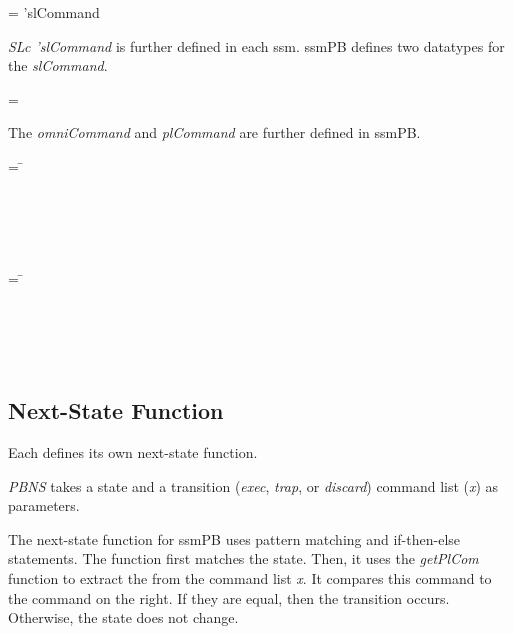 \documentclass[../../main/main.tex]{subfiles}
\begin{document}
 =   \HOLTokenBar{}  'slCommand

\textit{SLc 'slCommand} is further defined in each \gls{ssm}.  ssmPB defines two datatypes for the \textit{slCommand}.

 =   \HOLTokenBar{}  

The \textit{omniCommand} and \textit{plCommand} are further defined in ssmPB.

\begin{tabbing}
 = \= \\
						\>\HOLTokenBar{} \\
            					\>\HOLTokenBar{}  \\
						\>\HOLTokenBar{} \\
            					\>\HOLTokenBar{}  \\
						\>\HOLTokenBar{} 
\end{tabbing}

\begin{tabbing}
 = \= \\
						\>\HOLTokenBar{}  \\
						\>\HOLTokenBar{}  \\
						\>\HOLTokenBar{} \\
          					\>\HOLTokenBar{}  \\
						\>\HOLTokenBar{} 
\end{tabbing}

\subsection{Next-State Function}
Each  defines its own next-state function.  

\HOLssmPBIntegratedTheoremsPBNSXXdef

\textit{PBNS} takes a state and a transition (\textit{exec}, \textit{trap}, or \textit{discard}) command list (\textit{x}) as parameters.

The next-state function for ssmPB uses pattern matching and if-then-else statements.  The function first matches the state.  Then, it uses the \textit{getPlCom} function to extract the  from the command list \textit{x}. It compares this command to the command on the right.  If they are equal, then the transition occurs.  Otherwise, the state does not change.  
\end{document}
